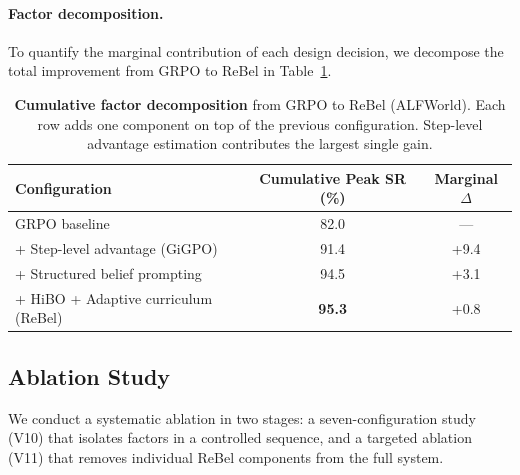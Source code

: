 \paragraph{Factor decomposition.}
To quantify the marginal contribution of each design decision, we decompose the
total improvement from GRPO to ReBel in Table~\ref{tab:factor_decomposition}.

\begin{table}[t]
  \centering
  \caption{%
    \textbf{Cumulative factor decomposition} from GRPO to ReBel (ALFWorld).
    Each row adds one component on top of the previous configuration.
    Step-level advantage estimation contributes the largest single gain.
  }
  \label{tab:factor_decomposition}
  \vspace{4pt}
  \small
  \renewcommand{\arraystretch}{1.15}
  \begin{tabular}{@{}l c c@{}}
    \toprule
    \textbf{Configuration} & \textbf{Cumulative Peak SR (\%)} & \textbf{Marginal $\Delta$} \\
    \midrule
    GRPO baseline                          & 82.0 & --- \\
    + Step-level advantage (GiGPO)         & 91.4 & +9.4 \\
    + Structured belief prompting          & 94.5 & +3.1 \\
    + HiBO + Adaptive curriculum (ReBel)   & \textbf{95.3} & +0.8 \\
    \bottomrule
  \end{tabular}
\end{table}


\subsection{Ablation Study}
\label{sec:ablation}

We conduct a systematic ablation in two stages: a seven-configuration study
(V10) that isolates factors in a controlled sequence, and a targeted ablation
(V11) that removes individual ReBel components from the full system.

